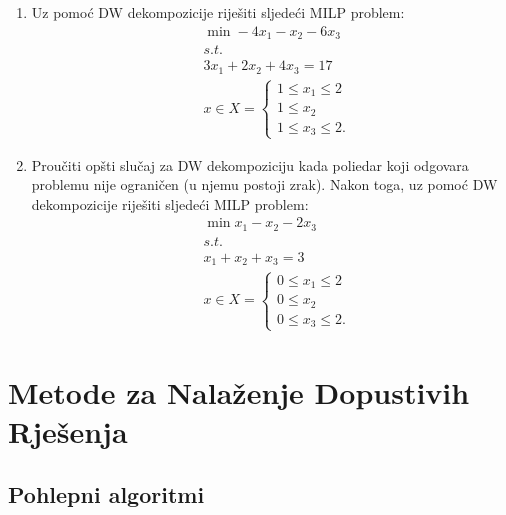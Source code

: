 \documentclass[a4paper, utf8, 11pt, colorlinks]{book}
\begin{document}
\begin{enumerate}
\item %
	Uz pomoć   DW dekompozicije riješiti sljedeći MILP problem:
\begin{align*}
	 &\min -4x_1 - x_2 - 6 x_3 \\
	 & s.t.\\
	 & 3 x_1 + 2 x_2 + 4 x_3 = 17 \\
	 & x \in X = \begin{cases}
	 	1 \leq x_1 \leq 2 \\
	 	1 \leq x_2 \\
	    1 \leq x_3 \leq 2. 
	 \end{cases}
\end{align*}
\item %
    Proučiti opšti slučaj za DW dekompoziciju kada poliedar koji odgovara problemu nije ograničen (u njemu postoji zrak). Nakon toga, uz pomoć DW dekompozicije riješiti sljedeći MILP problem:
	\begin{align*}
		 &\min x_1 - x_2 - 2 x_3 \\
		 & s.t. \\
		 & x_1 + x_2 + x_3 = 3 \\
		 & x \in X = \begin{cases}
		 	        0 \leq x_1 \leq 2 \\
		 	        0 \leq x_2 \\
		 	        0 \leq x_3 \leq 2. 
		 \end{cases}
	\end{align*}

\end{enumerate}



 \chapter{Metode za Nalaženje Dopustivih Rješenja}

\section{Pohlepni algoritmi}
 
\end{document}
